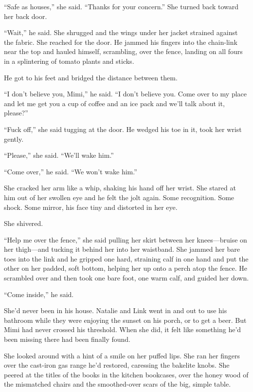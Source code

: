 \documentclass{article}
\begin{document}
``Safe as houses,'' she said.  ``Thanks for your concern.'' She turned
back toward her back door.

``Wait,'' he said.  She shrugged and the wings under her jacket
strained against the fabric.  She reached for the door.  He jammed his
fingers into the chain-link near the top and hauled himself,
scrambling, over the fence, landing on all fours in a splintering of
tomato plants and sticks.

He got to his feet and bridged the distance between them.

``I don't believe you, Mimi,'' he said.  ``I don't believe you.  Come
over to my place and let me get you a cup of coffee and an ice pack
and we'll talk about it, please?''

``Fuck off,'' she said tugging at the door.  He wedged his toe in it,
took her wrist gently.

``Please,'' she said.  ``We'll wake him.''

``Come over,'' he said.  ``We won't wake him.''

She cracked her arm like a whip, shaking his hand off her wrist.  She
stared at him out of her swollen eye and he felt the jolt again.  Some
recognition.  Some shock.  Some mirror, his face tiny and distorted in
her eye.

She shivered.

``Help me over the fence,'' she said pulling her skirt between her
knees---bruise on her thigh---and tucking it behind her into her
waistband.  She jammed her bare toes into the link and he gripped one
hard, straining calf in one hand and put the other on her padded, soft
bottom, helping her up onto a perch atop the fence.  He scrambled over
and then took one bare foot, one warm calf, and guided her down.

``Come inside,'' he said.

She'd never been in his house.  Natalie and Link went in and out to
use his bathroom while they were enjoying the sunset on his porch, or
to get a beer.  But Mimi had never crossed his threshold.  When she
did, it felt like something he'd been missing there had been finally
found.

She looked around with a hint of a smile on her puffed lips.  She ran
her fingers over the cast-iron gas range he'd restored, caressing the
bakelite knobs.  She peered at the titles of the books in the kitchen
bookcases, over the honey wood of the mismatched chairs and the
smoothed-over scars of the big, simple table.
\end{document}
